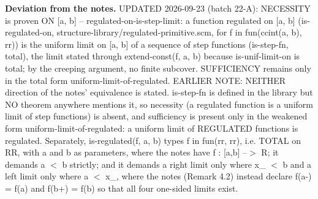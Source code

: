 \noindent\textbf{Deviation from the notes.} UPDATED 2026-09-23 (batch 22-A): NECESSITY is proven ON [a, b] -- regulated-on-is-step-limit: a function regulated on [a, b] (is-regulated-on, structure-library/regulated-primitive.scm, for f in fun(ccint(a, b), rr)) is the uniform limit on [a, b] of a sequence of step functions (is-step-fn, total), the limit stated through extend-const(f, a, b) because is-unif-limit-on is total; by the creeping argument, no finite subcover. SUFFICIENCY remains only in the total form uniform-limit-of-regulated. EARLIER NOTE: NEITHER direction of the notes' equivalence is stated.  is-step-fn is defined in the library but NO theorem anywhere mentions it, so necessity (a regulated function is a uniform limit of step functions) is absent, and sufficiency is present only in the weakened form uniform-limit-of-regulated: a uniform limit of REGULATED functions is regulated. Separately, is-regulated(f, a, b) types f in fun(rr, rr), i.e. TOTAL on RR, with a and b as parameters, where the notes have f : [a,b] --$>$ R; it demands a $<$ b strictly; and it demands a right limit only where x\_ $<$ b and a left limit only where a $<$ x\_, where the notes (Remark 4.2) instead declare f(a-) = f(a) and f(b+) = f(b) so that all four one-sided limits exist.
%
\renewcommand{\thethm}{4.8}
\begin{prop}\label{thm:antiderivable-add}
%
\leavevmode
{}
%
\end{prop}
